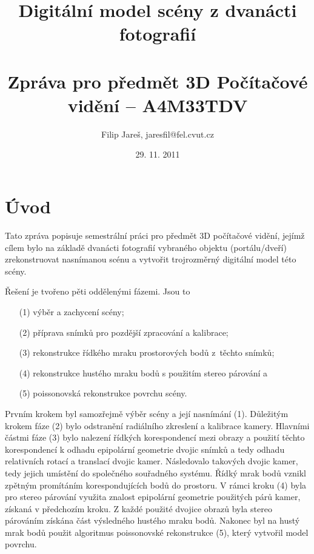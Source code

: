 \documentclass[11pt,oneside,a4paper,pdftex]{article}   %
\title{Digitální model scény z dvanácti fotografií \\ \ \\ \large Zpráva pro předmět 3D Počítačové vidění -- A4M33TDV}
\date{29. 11. 2011}
\author{Filip Jareš, jaresfil@fel.cvut.cz}
\begin{document}
\maketitle


\section*{Úvod}

	Tato zpráva popisuje semestrální práci pro předmět 3D počítačové vidění, jejímž cílem bylo na základě
	dvanácti fotografií vybraného objektu (portálu/dveří) zrekonstruovat nasnímanou scénu a vytvořit
	trojrozměrný digitální model této scény.
	
	Řešení je tvořeno pěti oddělenými fázemi. Jsou to
	\begin{enumerate}
		\item[(1)] výběr a zachycení scény;
		\item[(2)] příprava snímků pro pozdější zpracování a kalibrace;
		\item[(3)] rekonstrukce řídkého mraku prostorových bodů z~těchto snímků;
		\item[(4)] rekonstrukce hustého mraku bodů s použitím stereo párování a
		\item[(5)] poissonovská rekonstrukce povrchu scény.
	\end{enumerate}
	
	Prvním krokem byl samozřejmě výběr scény a její nasnímání (1).
	Důležitým krokem fáze (2) bylo odstranění radiálního zkreslení a kalibrace kamery. Hlavními částmi fáze
	(3) bylo nalezení řídkých korespondencí mezi obrazy a použití těchto korespondencí k odhadu epipolární
	geometrie dvojic snímků a tedy odhadu relativních rotací a translací dvojic kamer.  Následovalo
	 takových dvojic kamer, tedy jejich umístění do společného souřadného systému. Řídký
	mrak bodů vznikl zpětným promítáním korespondujících bodů do prostoru. V rámci kroku (4) byla pro
	stereo párování využita znalost epipolární geometrie použitých párů kamer, získaná v předchozím
	kroku.  Z každé použité dvojice obrazů byla stereo párováním získána část výsledného hustého mraku
	bodů.  Nakonec byl na hustý mrak bodů použit algoritmus poissonovské rekonstrukce (5), který vytvořil
	model povrchu.
	
\end{document}
